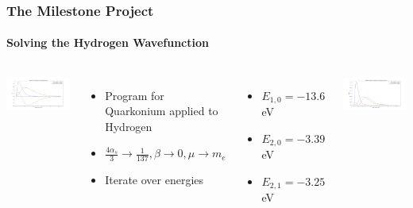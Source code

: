 \documentclass[mathserif, 10pt,usenames,dvipsnames]{beamer}
\begin{document}
\begin{frame}
    \frametitle{The Milestone Project}
    \framesubtitle{Solving the Hydrogen Wavefunction}
    \begin{columns}[c]
        \begin{center}
            \includegraphics[scale=0.1]{../images/hydro.png}
        \end{center}
        \begin{itemize}
            \item Program for Quarkonium applied to Hydrogen
            \item $\frac{4\alpha_s}{3} \to \frac{1}{137}, \beta \to 0, \mu \to m_e$
            \item Iterate over energies
        \end{itemize}
        \begin{itemize}
            \item $E_{1,0} = -13.6\,$eV
            \item $E_{2,0} = -3.39\,$eV
            \item $E_{2,1} = -3.25\,$eV
        \end{itemize}
        \begin{center}
            \includegraphics[scale=0.1]{../images/probs.png}
        \end{center}
        \end{columns}
\end{frame}
\end{document}
